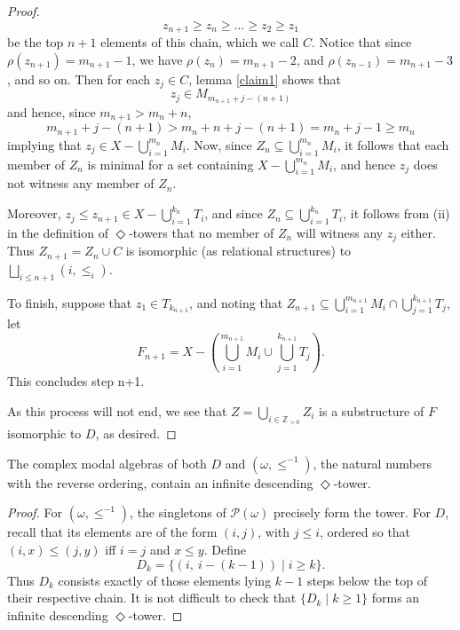 \documentclass[submission]{eptcs}
\begin{document}
\begin{proof}
    \[
    z_{n+1} \geq z_{n}\geq \dots \geq z_{2} \geq z_{1}
    \]
    be the top $n+1$ elements of this chain, which we call $C$. 
    Notice that since $\rho(z_{n+1})=m_{n+1}-1$, we have $\rho(z_n)=m_{n+1}-2$, and $\rho(z_{n-1})=m_{n+1}-3$, and so on.
    Then for each $z_j\in C$, lemma \ref{claim1} shows that
    \[
    z_{j} \in M_{m_{n+1}+j-(n+1)}
    \]
    and hence, since $m_{n+1}>m_n + n$,
    \[
    m_{n+1}+j-(n+1)> m_n +n+j-(n+1)=m_n+j-1\geq m_n
    \]
    implying that $z_{j} \in X-\bigcup_{i=1}^{m_n}M_i$.
    Now, since $Z_n \subseteq \bigcup_{i=1}^{m_n}M_i$, it follows that 
    each member of $Z_n$ is minimal for a set containing $X-\bigcup_{i=1}^{m_n}M_i$, and hence $z_j$ does not witness any member of $Z_n$.
    \par
    Moreover, $z_{j} \leq z_{n+1}\in X-\bigcup_{i=1}^{k_n}T_i$, and 
    since $Z_n\subseteq\bigcup_{i=1}^{k_n}T_i$,
    it follows from (ii) in the definition of $\Diamond$-towers that no member of $Z_n$ will witness any $z_{j}$ either.
    Thus $Z_{n+1}=Z_n \cup C$ is isomorphic (as relational structures) to $\bigsqcup_{i\leq n+1}(i,\leq_i)$.
    \par
    To finish, suppose that $z_{1} \in T_{k_{n+1}}$, and noting that $Z_{n+1}\subseteq \bigcup_{i=1}^{m_{n+1}}M_i \cap \bigcup_{j=1}^{k_{n+1}}T_j$, let
    \[
    F_{n+1}=X-(\bigcup_{i=1}^{m_{n+1}} M_i \cup \bigcup_{j=1}^{k_{n+1}} T_j).
    \]
    This concludes step n+1.
    \par
    \smallskip
    As this process will not end, we see that $Z=\bigcup_{i \in \mathbb{Z}_{>0}} Z_i$ is a substructure of $F$ isomorphic to $D$, as desired.

\end{proof}

\begin{lemma} \label{lemma:D&idc_not_tunable}
    The complex modal algebras of both $D$ and $(\omega,\leq^{-1})$, the natural numbers with the reverse ordering, contain an infinite descending $\Diamond$-tower.
\end{lemma}

\begin{proof}
For $(\omega,\leq^{-1})$, the singletons of $\mathcal{P}(\omega)$ precisely form the tower.
For $D$, recall that its elements are of the form $(i,j)$, with $j \leq i$, ordered so that $(i,x)\leq (j,y)$ iff $i=j$ and $x\leq y$. Define
\[
D_k=\{(i,\ i-(k-1))\mid i\geq k\}.
\]
Thus $D_k$ consists exactly of those elements lying $k-1$ steps below the top of their respective chain.
It is not difficult to check that $\{D_k\mid k \geq 1\}$ forms an infinite descending $\Diamond$-tower.
\end{proof}
\end{document}

